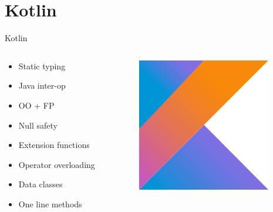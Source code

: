 \documentclass[aspectratio=169]{beamer}
\begin{document}
{
    \section{Kotlin}
}

\begin{frame}{Kotlin}
\begin{columns}
	\begin{column}{0.5\textwidth}
		\begin{itemize}
			\item Static typing
			\item Java inter-op
			\item OO + FP
			\item Null safety
			\item Extension functions
			\item Operator overloading
			\item Data classes
			\item One line methods
		\end{itemize}
	\end{column}
	\begin{column}{0.5\textwidth}  %
		\begin{figure}
			\centering
			\includegraphics[width=0.7\linewidth]{Images/kotlin}
		\end{figure}
	\end{column}
\end{columns}
\end{frame}
\end{document}
